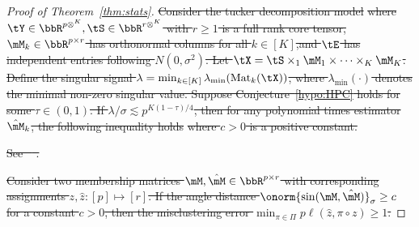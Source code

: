 \documentclass[lettersize,onecolumn,journal]{IEEEtran}
\theoremstyle{definition}
\newtheorem{lem}{Lemma}
\theoremstyle{definition}
\newcommand{\Mat}{\text{Mat}}
\def\fixme#1#2{\textbf{\color{red}[FIXME (#1): #2]}}
\providecommand{\DIFdeltex}[1]{{\protect\color{red}\sout{#1}}}                      %
\providecommand{\DIFdel}[1]{\texorpdfstring{\DIFdeltex{#1}}{}} %
\begin{document}
\begin{proof}[Proof of Theorem~\ref{thm:stats}]
\DIFdel{Consider the tucker decomposition model 
}%
\DIFdel{where $\tY \in \bbR^{p\otimes^K }, \tS \in \bbR^{r \otimes^K}$ with $r \geq 1$ is a full rank core tensor,$\mM_k \in \bbR^{p \times r}$ has orthonormal columns for all $k \in [K]$,and $\tE$ has independent entries following $N(0,\sigma^2)$. Let $\tX = \tS \times_1 \mM_1 \times \cdots \times_K \mM_K $. Define the singular signal $\lambda = \min_{k \in [K]}\lambda_{\min} (\Mat_k(\tX))$, where $\lambda_{\min}(\cdot)$ denotes the minimal non-zero singular value. Suppose Conjecture~\ref{hypo:HPC} holds for some $\tau \in (0,1)$. If $\lambda /\sigma \lesssim p^{K(1- \tau)/4}$, then for any polynomial times estimator $\hat \mM_k$, the following inequality holds
}%
\DIFdel{where $c >0$ is a positive constant. 
}%

\DIFdel{See \mbox{%
\citet[Proof of Theorem 4]{zhang2018tensor}}\hspace{0pt}%
.
}%

\DIFdel{Consider two membership matrices $\mM, \hat \mM \in \bbR^{p \times r}$ with corresponding assignments $z, \hat z: [p] \mapsto [r]$. If the angle distance $\onorm{\sin (\mM, \hat \mM)}_{\sigma} \geq c$ for a constant $c >0$, then the misclustering error $\min_{\pi \in \Pi}p\ell(\hat z,\pi \circ z )\geq 1$.
}%


\end{proof}
\end{document}
